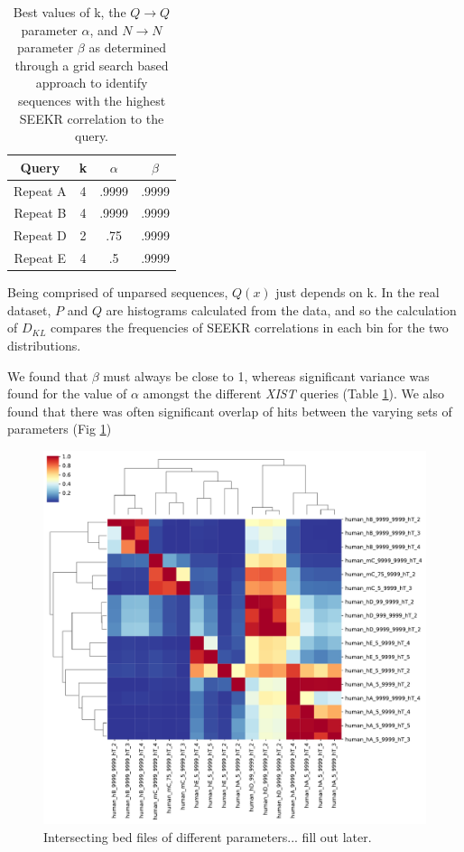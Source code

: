\begin{table}[h]
\centering
\begin{center}
 \begin{tabular}{|c | c| c | c |} 
 \hline
 Query & k & $\alpha$ & $\beta$ \\
 \hline\hline
 Repeat A & 4 & .9999 & .9999 \\ 
 \hline
 Repeat B & 4 & .9999 & .9999\\
 \hline
 Repeat D & 2 & .75 & .9999\\
 \hline
 Repeat E & 4 & .5 & .9999\\
 \hline
\end{tabular}
\end{center}
\caption{Best values of k, the $Q\rightarrow Q$ parameter $\alpha$, and $N\rightarrow N$ parameter $\beta$ as determined through a grid search based approach to identify sequences with the highest SEEKR correlation to the query.}
\label{tbl:transparams}
\end{table}

Being comprised of unparsed sequences, $Q(x)$ just depends on k.
In the real dataset, $P$ and $Q$ are histograms calculated from the data, and so the calculation of $D_{KL}$ compares the frequencies of SEEKR correlations in each bin for the two distributions. 

We found that $\beta$ must always be close to 1, whereas significant variance was found for the value of $\alpha$ amongst the different \emph{XIST} queries (Table \ref{tbl:transparams}). We also found that there was often significant overlap of hits between the varying sets of parameters (Fig \ref{fig:overlapparams})

\begin{figure}[h]
\centering
\includegraphics[width=\textwidth]{images/intersection.pdf}
\caption{Intersecting bed files of different parameters... fill out later.}
\label{fig:overlapparams}
\end{figure}

